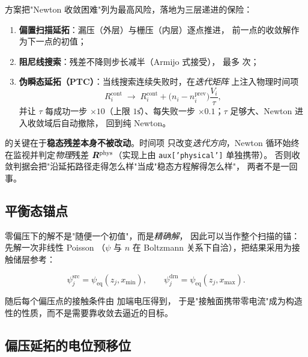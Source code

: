 方案把"Newton 收敛困难"列为最高风险，落地为三层递进的保险：

\begin{enumerate}[leftmargin=1.9em,itemsep=0.4em,topsep=0.4em]
  \item \textbf{偏置扫描延拓}：漏压（外层）与栅压（内层）逐点推进，
        前一点的收敛解作为下一点的初值；
  \item \textbf{阻尼线搜索}：残差不降则步长减半（Armijo 式接受），
        最多  次；
  \item \textbf{伪瞬态延拓（PTC）}：当线搜索连续失败时，在\emph{迭代矩阵}
        上注入物理时间项
        \begin{equation}
        R^{\text{cont}}_i \;\to\; R^{\text{cont}}_i
        + \bigl(n_i-n_i^{\text{prev}}\bigr)\frac{V_i}{\tau},
        \label{eq:dd-ptc}
        \end{equation}
        并让 $\tau$ 每成功一步 $\times10$（上限 $1$\U{s}）、每失败一步
        $\times0.1$；$\tau$ 足够大、Newton 进入收敛域后自动撤除，
        回到纯 Newton。
\end{enumerate}

 的关键在于\textbf{稳态残差本身不被改动}。时间项
只改变\emph{迭代方向}，Newton 循环始终在监视并判定\emph{物理}残差
$\bm{R}^{\text{phys}}$（实现上由 \texttt{aux['physical']} 单独携带）。
否则收敛判据会把"沿延拓路径走得怎么样"当成"稳态方程解得怎么样"，
两者不是一回事。

\subsection{平衡态锚点}
\label{sec:dd-equilibrium}

零偏压下的解不是"随便一个初值"，而是\emph{精确解}，
因此可以当作整个扫描的锚：先解一次非线性 Poisson
（$\psi$ 与 $n$ 在 Boltzmann 关系下自洽），把结果采用为接触储层参考：

\begin{equation}
\psi^{\text{src}}_j = \psi_{\text{eq}}(z_j, x_{\min}),
\qquad
\psi^{\text{drn}}_j = \psi_{\text{eq}}(z_j, x_{\max}).
\label{eq:dd-reservoirs}
\end{equation}

随后每个偏压点的接触条件由  加端电压得到，
于是"接触面携带零电流"成为构造性的性质，而不是需要靠收敛去逼近的目标。

\subsection{偏压延拓的电位预移位}
\label{sec:dd-bias-shift}

